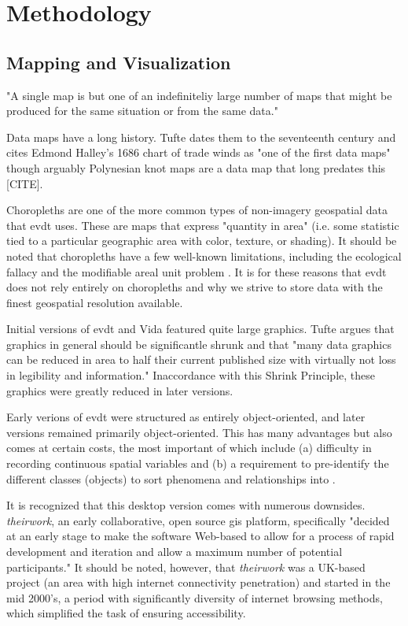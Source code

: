 \chapter{Methodology}



\section{Mapping and Visualization}


"A single map is but one of an indefiniteliy large number of maps that might be produced for the same situation or from the same data." \cite{monmonierHowLieMaps1996}

Data maps have a long history. Tufte dates them to the seventeenth century and cites Edmond Halley's 1686 chart of trade winds as "one of the first data maps" \cite{tufteVisualDisplayQuantitative2001} though arguably Polynesian knot maps are a data map that long predates this [CITE].

Choropleths are one of the more common types of non-imagery geospatial data that \ac{evdt} uses. These are maps that express "quantity in area" (i.e. some statistic tied to a particular geographic area with color, texture, or shading). It should be noted that choropleths have a few well-known limitations, including the ecological fallacy and the modifiable areal unit problem \cite{cramptonRethinkingMapsIdentity2011}. It is for these reasons that \ac{evdt} does not rely entirely on choropleths and why we strive to store data with the finest geospatial resolution available.

Initial versions of \ac{evdt} and Vida featured quite large graphics. Tufte argues that graphics in general should be significantle shrunk and that "many data graphics can be reduced in area to half their current published size with virtually not loss in legibility and information." \cite{tufteVisualDisplayQuantitative2001} Inaccordance with this Shrink Principle, these graphics were greatly reduced in later versions.

Early verions of \ac{evdt} were structured as entirely object-oriented, and later versions remained primarily object-oriented. This has many advantages but also comes at certain costs, the most important of which include (a) difficulty in recording continuous spatial variables and (b) a requirement to pre-identify the different classes (objects) to sort phenomena and relationships into \cite{goodchildModelingEarth2011}. 

It is recognized that this desktop version comes with numerous downsides. \textit{theirwork}, an early collaborative, open source \ac{gis} platform, specifically "decided at an early stage to make the software Web-based to allow for a process of rapid development and iteration and allow a maximum number of potential participants." \cite{williamsonTheirworkDevelopmentSustainable2011} It should be noted, however, that \textit{theirwork} was a UK-based project (an area with high internet connectivity penetration) and started in the mid 2000's, a period with significantly diversity of internet browsing methods, which simplified the task of ensuring accessibility.

